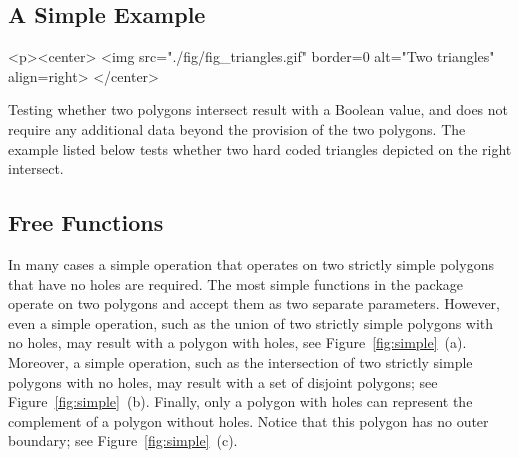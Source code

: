 \subsection{A Simple Example}
\label{bso_ssec:simple_example}
\lcHtml{\label{fig:example}}
\begin{ccHtmlOnly}
  <p><center>
    <img src="./fig/fig_triangles.gif" border=0 alt="Two triangles" align=right>
  </center>
\end{ccHtmlOnly}
Testing whether two polygons intersect result with a Boolean value, 
and does not require any additional data beyond the provision of the 
two polygons. The example listed below tests whether two hard coded 
triangles depicted on the right intersect.


\subsection{Free Functions}
\label{bso_ssec:free_functions}
In many cases a simple operation that operates on two strictly simple
polygons that have no holes are required. The most simple functions in
the package operate on two polygons and accept them as two separate
parameters. However, even a simple operation, such as the union of two
strictly simple polygons with no holes, may result with a polygon with
holes, see Figure~\ref{fig:simple}~(a). Moreover, a simple operation,
such as the intersection of two strictly simple polygons with no holes, 
may result with a set of disjoint polygons; see
Figure~\ref{fig:simple}~(b). Finally, only a polygon with holes can
represent the complement of a polygon without holes. Notice that this
polygon has no outer boundary; see Figure~\ref{fig:simple}~(c).

